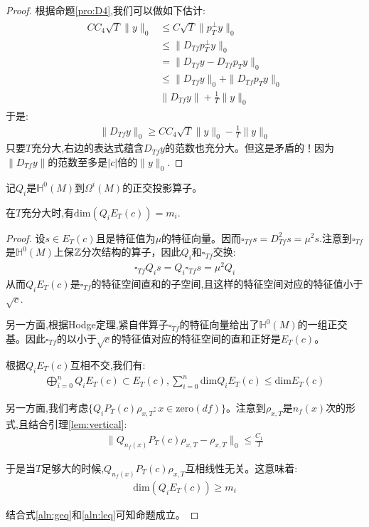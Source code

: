 \begin{proof}
	根据命题\ref{pro:D4},我们可以做如下估计:
	\begin{align}
		\begin{split}
			CC_4\sqrt{T}\|y\|_0 &\leq C\sqrt{T}\|p_T^{\perp}y\|_0 \\ 
			&\leq \|D_{Tf}p_T^{\perp}y\|_0 \\
			&=\|D_{Tf}y-D_{Tf}p_Ty\|_0\\
			&\leq \|D_{Tf}y\|_0+\|D_{Tf}p_Ty\|_0\\
			&\|D_{Tf}y\|+\frac{1}{T}\|y\|_0
		\end{split}
	\end{align}
	于是:
	\begin{align}
		\|D_{Tf}y\|_0 \geq CC_4\sqrt{T}\|y\|_0-\frac{1}{T}\|y\|_0
	\end{align}
	只要$T$充分大,右边的表达式蕴含$D_{Tf}y$的范数也充分大。但这是矛盾的！因为$\|D_{Tf}y\|$的范数至多是$|c|$倍的$\|y\|_0$.
\end{proof}
记$Q_i$是$\mathbb{H}^0(M)$到$\Omega^i(M)$的正交投影算子。
\begin{proposition}\label{pro:dimQi}
	在$T$充分大时,有$\mathrm{dim}(Q_iE_T(c))=m_i$.
\end{proposition}
\begin{proof}
	设$s \in E_T(c)$且是特征值为$\mu$的特征向量。因而$\square_{Tf}s=D_{Tf}^2s=\mu^2s$.注意到$\square_{Tf}$是$\mathbb{H}^0(M)$上保$\mathbb{Z}$分次结构的算子，因此$Q_i$和$\square_{Tf}$交换:
	\begin{align}
	\square_{Tf}Q_is=Q_i\square_{Tf}s=\mu^2Q_i
	\end{align}
	从而$Q_iE_T(c)$是$\square_{Tf}$的特征空间直和的子空间,且这样的特征空间对应的特征值小于$\sqrt{c}$.

	另一方面,根据Hodge定理,紧自伴算子$\square_{Tf}$的特征向量给出了$\mathbb{H}^0(M)$的一组正交基。因此$\square_{Tf}$的以小于$\sqrt{c}$的特征值对应的特征空间的直和正好是$E_T(c)$。

	根据$Q_iE_T(c)$互相不交,我们有:
	\begin{align}\label{aln:leq}
		\bigoplus_{i=0}^n Q_i E_T(c) \subset E_T(c),\sum_{i=0}^n \mathrm{dim}Q_iE_T(c) \leq \mathrm{dim}E_T(c)
	\end{align}
	
	另一方面,我们考虑$\{Q_i P_T(c)\rho_{x,T}:x \in \mathrm{zero}(df)\}$。注意到$\rho_{x,T}$是$n_f(x)$次的形式,且结合引理\ref{lem:vertical}:
	\begin{align}
		\|Q_{n_f(x)}P_T(c)\rho_{x,T}-\rho_{x,T}\|_0 \leq \frac{C_1}{T}
	\end{align}

	于是当$T$足够大的时候,$Q_{n_f(x)}P_T(c)\rho_{x,T}$互相线性无关。这意味着:
	\begin{align}\label{aln:geq}
		\mathrm{dim}(Q_iE_T(c))\geq m_i
	\end{align}

	结合式\ref{aln:geq}和\ref{aln:leq}可知命题成立。
\end{proof}

